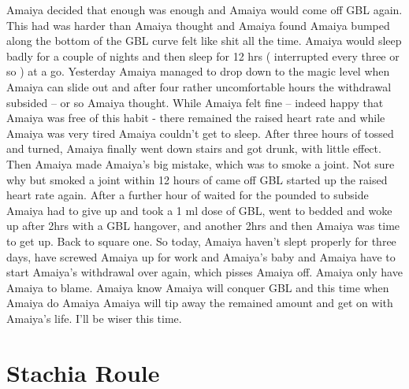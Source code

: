 \documentclass[12pt]{book}
\begin{document}
Amaiya decided that enough was enough and Amaiya would come off GBL again. This had was harder than Amaiya thought and Amaiya found Amaiya bumped along the bottom of the GBL curve felt like shit all the time. Amaiya would sleep badly for a couple of nights and then sleep for 12 hrs ( interrupted every three or so ) at a go. Yesterday Amaiya managed to drop down to the magic level when Amaiya can slide out and after four rather uncomfortable hours the withdrawal subsided -- or so Amaiya thought. While Amaiya felt fine -- indeed happy that Amaiya was free of this habit - there remained the raised heart rate and while Amaiya was very tired Amaiya couldn't get to sleep. After three hours of tossed and turned, Amaiya finally went down stairs and got drunk, with little effect. Then Amaiya made Amaiya's big mistake, which was to smoke a joint. Not sure why but smoked a joint within 12 hours of came off GBL started up the raised heart rate again. After a further hour of waited for the pounded to subside Amaiya had to give up and took a 1 ml dose of GBL, went to bedded and woke up after 2hrs with a GBL hangover, and another 2hrs and then Amaiya was time to get up. Back to square one. So today, Amaiya haven't slept properly for three days, have screwed Amaiya up for work and Amaiya's baby and Amaiya have to start Amaiya's withdrawal over again, which pisses Amaiya off. Amaiya only have Amaiya to blame. Amaiya know Amaiya will conquer GBL and this time when Amaiya do Amaiya Amaiya will tip away the remained amount and get on with Amaiya's life. I'll be wiser this time.



\chapter{Stachia Roule}
\end{document}

